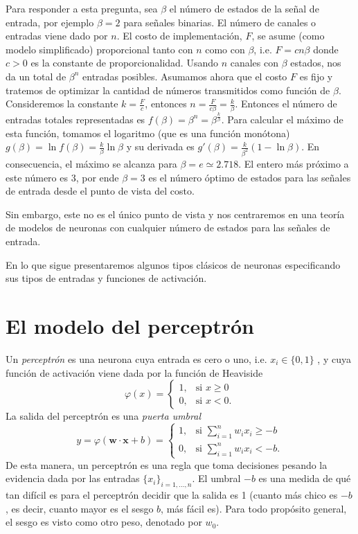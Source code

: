 \documentclass[12pt, a4paper]{amsbook}
\newcommand{\ww}{{\mathbf w}}
\newcommand{\xx}{{\mathbf x}}
\theoremstyle{remark}
\theoremstyle{definition}
\numberwithin{section}{chapter}
\numberwithin{subsection}{section}
\numberwithin{equation}{section}
\numberwithin{figure}{chapter}
\begin{document}
Para responder a esta pregunta, sea $\beta$ el número de estados de la señal de entrada, por ejemplo $\beta=2$ para señales binarias. El número de canales o entradas viene dado por $n$. El costo de implementación, $F$, se asume (como modelo simplificado) proporcional tanto con $n$ como con $\beta$, i.e. $F=cn\beta$ donde $c>0$ es la constante de proporcionalidad. Usando $n$ canales con $\beta$ estados, nos da un total de $\beta^n$ entradas posibles. Asumamos ahora que el costo $F$ es fijo y tratemos de optimizar la cantidad de números transmitidos como función de $\beta$. Consideremos la constante $k=\tfrac{F}{c}$, entonces $n=\tfrac{F}{c\beta} = \tfrac{k}{\beta}$. Entonces el número de entradas totales representadas es $f(\beta) = \beta^n = \beta^{\frac{k}{\beta}}$. Para calcular el máximo de esta función, tomamos el logaritmo (que es una función monótona) $g(\beta) = \ln f(\beta) = \tfrac{k}{\beta} \ln \beta$ y su derivada es $g'(\beta)=\tfrac{k}{\beta^2}(1-\ln \beta)$. En consecuencia, el máximo se alcanza para $\beta=e\simeq 2.718$. El entero más próximo a este número es 3, por ende $\beta=3$ es el número óptimo de estados para las señales de entrada desde el punto de vista del costo. 

Sin embargo, este no es el único punto de vista y nos centraremos en una teoría de modelos de neuronas con cualquier número de estados para las señales de entrada.

En lo que sigue presentaremos algunos tipos clásicos de neuronas especificando sus tipos de entradas y funciones de activación.

\section{El modelo del perceptrón}\label{sec.c5.2}

Un {\em perceptrón} es una neurona cuya entrada es cero o uno, i.e. $x_i\in \{0, 1\}$ , y cuya función de activación viene dada por la función de Heaviside
$$
\varphi(x) = \begin{cases}
1,& \text{si } x\ge 0\\
0,& \text{si } x< 0.
\end{cases}
$$
La salida del perceptrón es una {\em puerta umbral}
$$
y=\varphi(\ww\cdot \xx + b) = \begin{cases}
1,& \text{si } \sum_{i=1}^n w_i x_i \ge -b\\
0,& \text{si } \sum_{i=1}^n w_i x_i < -b.
\end{cases}
$$
De esta manera, un perceptrón es una regla que toma decisiones pesando la evidencia dada por las entradas $\{x_i\}_{i=1,\dots,n}$. El umbral $-b$ es una medida de qué tan difícil es para el perceptrón decidir que la salida es 1 (cuanto más chico es $-b$, es decir, cuanto mayor es el sesgo $b$, más fácil es). Para todo propósito general, el sesgo es visto como otro peso, denotado por $w_0$.
\end{document}
